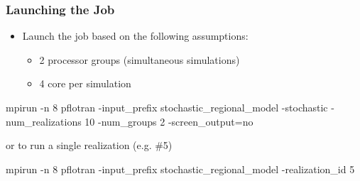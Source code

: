 \documentclass{beamer}
\begin{document}
\begin{frame}[fragile]\frametitle{Launching the Job}

\begin{itemize}
  \item Launch the job based on the following assumptions:
  \begin{itemize}
    \item 2 processor groups (simultaneous simulations)
    \item 4 core per simulation
  \end{itemize}

\end{itemize}

\begin{semiverbatim}
mpirun -n 8 pflotran
  -input_prefix stochastic_regional_model
  -stochastic
  -num_realizations 10
  -num_groups 2
  -screen_output=no
\end{semiverbatim}

or to run a single realization (e.g. \#5)

\begin{semiverbatim}
mpirun -n 8 pflotran
  -input_prefix stochastic_regional_model
  -realization_id 5
\end{semiverbatim}

\end{frame}
\end{document}
